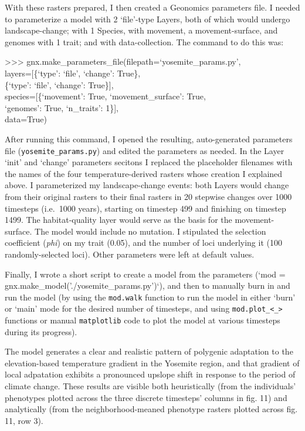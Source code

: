 ﻿\documentclass{article}
\newenvironment{allintypewriter}{\ttfamily}{\par}
\begin{document}
With these rasters prepared, I then created a Geonomics parameters file.
I needed to parameterize a model with 2 `file'-type Layers,
both of which would undergo landscape-change;
with 1 Species, with movement, a movement-surface, and
genomes with 1 trait; and with data-collection.
The command to do this was:

\begin{allintypewriter}
>>> gnx.make\_parameters\_file(filepath=`yosemite\_params.py',\\
                               layers=[\{`type': `file', `change': True\},\\
                                       \{`type': `file', `change': True\}],\\
                               species=[\{`movement': True, `movement\_surface': True,\\
                                          `genomes': True, `n\_traits': 1\}],\\
                               data=True)\\
\end{allintypewriter}

After running this command, I opened the resulting, auto-generated parameters
file (\texttt{yosemite\_params.py}) and edited the parameters as needed. In the Layer
`init' and `change' parameters secitons I replaced
the placeholder filenames with the names of the four temperature-derived
rasters whose creation I explained above. I parameterized my landscape-change
events: both Layers would change from their original rasters to their final
rasters in 20 stepwise changes over 1000 timesteps (i.e.\ 1000 years),
starting on timestep 499 and finishing on timestep 1499. The habitat-quality
layer would serve as the basis for the movement-surface. The model would include
no mutation. I stipulated the selection coefficient (\emph{phi}) on my trait
(0.05), and the number of loci underlying it (100 randomly-selected loci).
Other parameters were left at default values.

Finally, I wrote a short script to create a model from the parameters 
(`mod = gnx.make\_model('./yosemite\_params.py')`), and then to manually
burn in and run the model (by using the \texttt{mod.walk} function to run the model
in either `burn' or `main' mode for the desired number of timesteps, and using
\texttt{mod.plot\_<\_>} functions or manual \texttt{matplotlib} code
to plot the model at various timesteps during its progress).

The model generates a clear and realistic pattern of polygenic adaptation to
the elevation-based temperature gradient in the Yosemite region, and that
gradient of local adpatation exhibits a pronounced upslope shift in response to
the period of climate change. These results are visible both heuristically
(from the individuals' phenotypes plotted across the three discrete timesteps'
columns in fig. 11) and analytically (from the neighborhood-meaned phenotype
rasters plotted across fig. 11, row 3).
\end{document}
